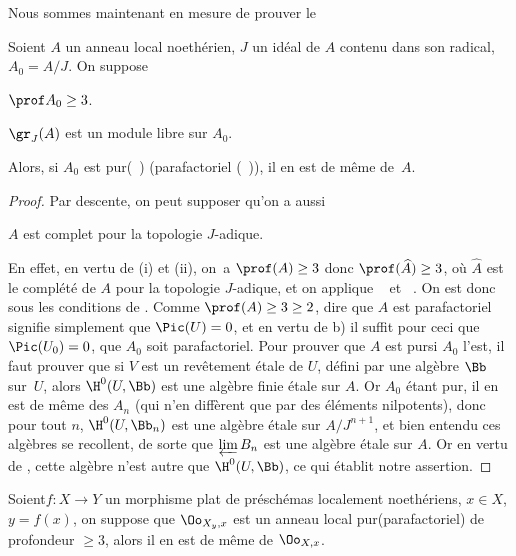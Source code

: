 Nous sommes maintenant en mesure de prouver le
\enlargethispage{-1\baselineskip}%
\begin{theoreme} \label{XII.4.7}
Soient $A$ un anneau local noeth\'erien, $J$ un id\'eal de $A$ contenu dans son radical, $A_0=A/J$. On suppose
\begin{enumeratei}
\item
$\prof A_0\geq 3$.
\item
$\gr_J(A)$ est un module libre sur $A_0$.
\end{enumeratei}
\noindent
Alors, si $A_0$ est \og pur\fg (~) (\resp parafactoriel (~)), il en est de m\^eme de~$A$.
\end{theoreme}

\begin{proof}
Par descente, on peut supposer qu'on a aussi
\begin{enumeratei}\setcounter{enumi}{2}
\item
$A$ est complet pour la topologie $J$-adique.
\end{enumeratei}

En effet, en vertu de (i) et (ii), on~a $\prof(A)\geq 3$ donc $\prof(\widehat{A})\geq 3$, o\`u $\widehat{A}$ est le compl\'et\'e de $A$ pour la topologie $J$-adique, et on applique ~ et ~. On est donc sous les conditions de . Comme $\prof(A)\geq 3\geq 2$, dire que $A$ est parafactoriel signifie simplement que $\Pic(U)=0$, et en vertu de  b) il suffit pour ceci que $\Pic(U_0)=0$, \ie que $A_0$ soit parafactoriel. Pour prouver que $A$ est \og pur\fg si $A_0$ l'est, il faut prouver que si $V$ est un rev\^etement \'etale de $U$, d\'efini par une alg\`ebre $\Bb$ sur~$U$, alors $\H^0(U, \Bb)$ est une alg\`ebre finie \'etale sur $A$. Or $A_0$ \'etant pur, il en est de m\^eme des $A_n$ (qui n'en diff\`erent que par des \'el\'ements nilpotents), donc pour tout $n$, $\H^0(U, \Bb_n)$ est une alg\`ebre \'etale sur $A/J^{n+1}$, et bien entendu ces alg\`ebres se recollent, de sorte que $\varprojlim B_n$ est une alg\`ebre \'etale sur $A$. Or en vertu de , cette alg\`ebre n'est autre que $\H^0(U, \Bb)$, ce qui \'etablit notre assertion.
\skipqed
\end{proof}

\begin{corollaire} \label{XII.4.8}
Soient\pageoriginale $f:X\to Y$ un morphisme plat de pr\'esch\'emas localement noeth\'eriens, $x\in X$, $y=f(x)$, on suppose que $\Oo_{X_y, x}$ est un anneau local \og pur\fg (\resp parafactoriel) de profondeur $\geq 3$, alors il en est de m\^eme de $\Oo_{X, x}$.
\end{corollaire}


